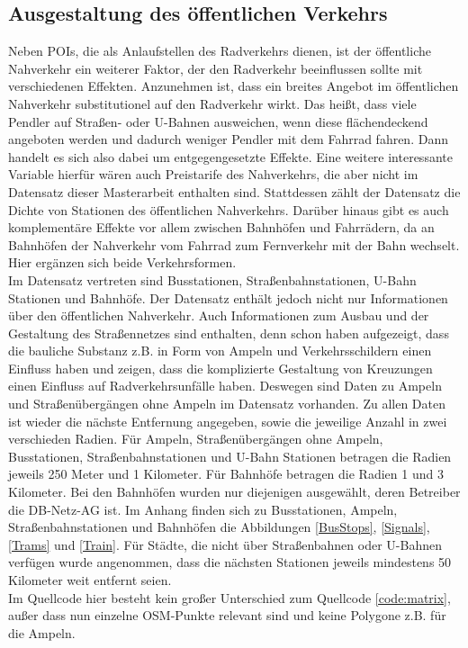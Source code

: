\documentclass[a4paper,12pt]{thesis}
\begin{document}
\subsection{Ausgestaltung des öffentlichen Verkehrs}

Neben POIs, die als Anlaufstellen des Radverkehrs dienen, ist der öffentliche Nahverkehr ein weiterer Faktor, der den Radverkehr beeinflussen sollte mit verschiedenen Effekten. Anzunehmen ist, dass ein breites Angebot im öffentlichen Nahverkehr substitutionel auf den Radverkehr wirkt. Das heißt, dass viele Pendler auf Straßen- oder U-Bahnen ausweichen, wenn diese flächendeckend angeboten werden und dadurch weniger Pendler mit dem Fahrrad fahren. Dann handelt es sich also dabei um entgegengesetzte Effekte. Eine weitere interessante Variable hierfür wären auch Preistarife des Nahverkehrs, die aber nicht im Datensatz dieser Masterarbeit enthalten sind. Stattdessen zählt der Datensatz die Dichte von Stationen des öffentlichen Nahverkehrs. Darüber hinaus gibt es auch komplementäre Effekte vor allem zwischen Bahnhöfen und Fahrrädern, da an Bahnhöfen der Nahverkehr vom Fahrrad zum Fernverkehr mit der Bahn wechselt. Hier ergänzen sich beide Verkehrsformen.\\
Im Datensatz vertreten sind Busstationen, Straßenbahnstationen, U-Bahn Stationen und Bahnhöfe. Der Datensatz enthält jedoch nicht nur Informationen über den öffentlichen Nahverkehr. Auch Informationen zum Ausbau und der Gestaltung des Straßennetzes sind enthalten, denn schon \cite{Heinen2010} haben aufgezeigt, dass die bauliche Substanz z.B. in Form von Ampeln und Verkehrsschildern einen Einfluss haben und \cite{Vandenbulcke2014} zeigen, dass die komplizierte Gestaltung von Kreuzungen einen Einfluss auf Radverkehrsunfälle haben. Deswegen sind Daten zu Ampeln und Straßenübergängen ohne Ampeln im Datensatz vorhanden. Zu allen Daten ist wieder die nächste Entfernung angegeben, sowie die jeweilige Anzahl in zwei verschieden Radien. Für Ampeln, Straßenübergängen ohne Ampeln, Busstationen, Straßenbahnstationen und U-Bahn Stationen betragen die Radien jeweils 250 Meter und 1 Kilometer. Für Bahnhöfe betragen die Radien 1 und 3 Kilometer. Bei den Bahnhöfen wurden nur diejenigen ausgewählt, deren Betreiber die DB-Netz-AG ist. Im Anhang finden sich zu Busstationen, Ampeln, Straßenbahnstationen und Bahnhöfen die Abbildungen \ref{BusStops}, \ref{Signals}, \ref{Trams} und \ref{Train}. Für Städte, die nicht über Straßenbahnen oder U-Bahnen verfügen wurde angenommen, dass die nächsten Stationen jeweils mindestens 50 Kilometer weit entfernt seien.\\
Im Quellcode hier besteht kein großer Unterschied zum Quellcode \ref{code:matrix}, außer dass nun einzelne OSM-Punkte relevant sind und keine Polygone z.B. für die Ampeln.
\end{document}
